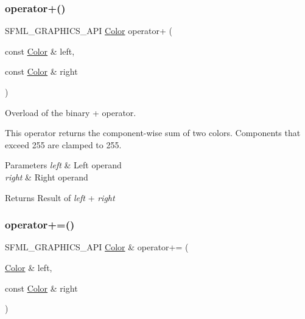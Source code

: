 \subsubsection{\texorpdfstring{operator+()}{operator+()}}
{\footnotesize\ttfamily S\+F\+M\+L\+\_\+\+G\+R\+A\+P\+H\+I\+C\+S\+\_\+\+A\+PI \mbox{\hyperlink{classsf_1_1_color}{Color}} operator+ (\begin{DoxyParamCaption}\item[{const \mbox{\hyperlink{classsf_1_1_color}{Color}} \&}]{left,  }\item[{const \mbox{\hyperlink{classsf_1_1_color}{Color}} \&}]{right }\end{DoxyParamCaption})\hspace{0.3cm}{\ttfamily [related]}}



Overload of the binary + operator. 

This operator returns the component-\/wise sum of two colors. Components that exceed 255 are clamped to 255.


\begin{DoxyParams}{Parameters}
{\em left} & Left operand \\
\hline
{\em right} & Right operand\\
\hline
\end{DoxyParams}
\begin{DoxyReturn}{Returns}
Result of {\itshape left} + {\itshape right} \begin{DoxyVerb}\end{DoxyVerb}
 
\end{DoxyReturn}
\mbox{\label{classsf_1_1_color_a19917f2453a4acfd69de2539bfab8031}} 
\subsubsection{\texorpdfstring{operator+=()}{operator+=()}}
{\footnotesize\ttfamily S\+F\+M\+L\+\_\+\+G\+R\+A\+P\+H\+I\+C\+S\+\_\+\+A\+PI \mbox{\hyperlink{classsf_1_1_color}{Color}} \& operator+= (\begin{DoxyParamCaption}\item[{\mbox{\hyperlink{classsf_1_1_color}{Color}} \&}]{left,  }\item[{const \mbox{\hyperlink{classsf_1_1_color}{Color}} \&}]{right }\end{DoxyParamCaption})\hspace{0.3cm}{\ttfamily [related]}}



